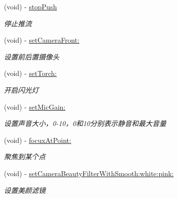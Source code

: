 \begin{DoxyCompactItemize}
\mbox{\label{interface_c_c_push_util_a41c09116f2e237058972f918765a8169}} 
(void) -\/ \hyperlink{interface_c_c_push_util_a41c09116f2e237058972f918765a8169}{stop\+Push}
\begin{DoxyCompactList}\small\item\em 停止推流 \end{DoxyCompactList}\item 
\mbox{\label{interface_c_c_push_util_ac1f328287df6b258312cb139f3be33bc}} 
(void) -\/ \hyperlink{interface_c_c_push_util_ac1f328287df6b258312cb139f3be33bc}{set\+Camera\+Front\+:}
\begin{DoxyCompactList}\small\item\em 设置前后置摄像头 \end{DoxyCompactList}\item 
\mbox{\label{interface_c_c_push_util_a280f4ead06a96bb58f25da97c85b09ad}} 
(void) -\/ \hyperlink{interface_c_c_push_util_a280f4ead06a96bb58f25da97c85b09ad}{set\+Torch\+:}
\begin{DoxyCompactList}\small\item\em 开启闪光灯 \end{DoxyCompactList}\item 
\mbox{\label{interface_c_c_push_util_a4494d30312c5ad7264bd08ae95e77d51}} 
(void) -\/ \hyperlink{interface_c_c_push_util_a4494d30312c5ad7264bd08ae95e77d51}{set\+Mic\+Gain\+:}
\begin{DoxyCompactList}\small\item\em 设置声音大小，0-\/10，0和10分别表示静音和最大音量 \end{DoxyCompactList}\item 
\mbox{\label{interface_c_c_push_util_ae178e219ed6572e239ebb018981a8607}} 
(void) -\/ \hyperlink{interface_c_c_push_util_ae178e219ed6572e239ebb018981a8607}{focux\+At\+Point\+:}
\begin{DoxyCompactList}\small\item\em 聚焦到某个点 \end{DoxyCompactList}\item 
(void) -\/ \hyperlink{interface_c_c_push_util_a1d24c1ff1a4f762e882a09650ec6fac4}{set\+Camera\+Beauty\+Filter\+With\+Smooth\+:white\+:pink\+:}
\begin{DoxyCompactList}\small\item\em 设置美颜滤镜 \end{DoxyCompactList}\item 

\end{DoxyCompactItemize}
